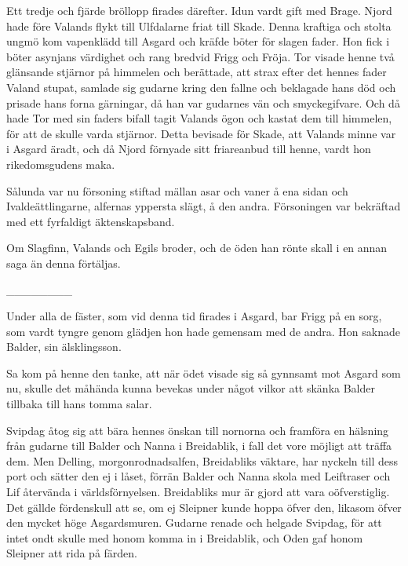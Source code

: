 Ett tredje och fjärde bröllopp firades därefter. Idun vardt gift med
Brage. Njord hade före Valands flykt till Ulfdalarne friat till Skade.
Denna kraftiga och stolta ungmö kom vapenklädd till Asgard och kräfde
böter för slagen fader. Hon fick i böter asynjans värdighet och rang
bredvid Frigg och Fröja. Tor visade henne två glänsande stjärnor på
himmelen och berättade, att strax efter det hennes fader Valand stupat,
samlade sig gudarne kring den fallne och beklagade hans död och prisade
hans forna gärningar, då han var gudarnes vän och smyckegifvare. Och då
hade Tor med sin faders bifall tagit Valands ögon och kastat dem till
himmelen, för att de skulle varda stjärnor. Detta bevisade för Skade,
\protect\hypertarget{lb1625905.xhtmlux5cux23start129}{}{}\protect\hypertarget{lb1625905.xhtmlux5cux23start129-a}{}{}\protect\hypertarget{lb1625905.xhtmlux5cux23start129-b}{}{}\protect\hypertarget{lb1625905.xhtmlux5cux23start129-c}{}{}\protect\hypertarget{lb1625905.xhtmlux5cux23start129-d}{}{}
att Valands minne var i Asgard äradt, och då Njord förnyade sitt
friareanbud till henne, vardt hon rikedomsgudens maka.

Sålunda var nu försoning stiftad mällan asar och vaner å ena sidan och
Ivaldeättlingarne, alfernas yppersta slägt, å den andra. Försoningen var
bekräftad med ett fyrfaldigt äktenskapsband.

Om Slagfinn, Valands och Egils broder, och de öden han rönte skall i en
annan saga än denna förtäljas.

{\_\_\_\_\_\_\_\_}

Under alla de fäster, som vid denna tid firades i Asgard, bar Frigg på
en sorg, som vardt tyngre genom glädjen hon hade gemensam med de andra.
Hon saknade Balder, sin älsklingsson.

Sa kom på henne den tanke, att när ödet visade sig så gynnsamt mot
Asgard som nu, skulle det måhända kunna bevekas under något vilkor att
skänka Balder tillbaka till hans tomma salar.

Svipdag åtog sig att bära hennes önskan till nornorna och framföra en
hälsning från gudarne till Balder och Nanna i Breidablik, i fall det
vore möjligt att träffa dem. Men Delling, morgonrodnadsalfen,
Breidabliks väktare, har nyckeln till dess port och sätter den ej i
låset, förrän Balder och Nanna skola med Leiftraser och Lif återvända i
världsförnyelsen. Breidabliks mur är gjord att vara oöfverstiglig. Det
gällde fördenskull att se, om ej Sleipner kunde hoppa öfver den, likasom
öfver den mycket höge Asgardsmuren. Gudarne renade och helgade Svipdag,
för att intet ondt skulle med honom komma in i Breidablik, och Oden gaf
honom Sleipner att rida på färden.


